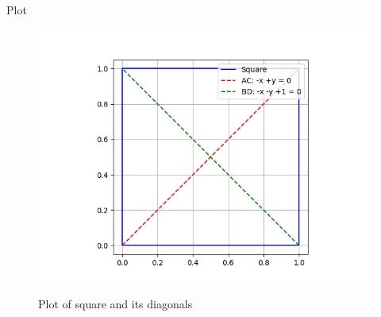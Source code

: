 \documentclass{beamer}
\begin{document}
\begin{frame}{Plot}
    \begin{figure}[H]
    \centering
    \caption{Plot of square and its diagonals}
    \includegraphics[width=0.6\columnwidth]{figs/Figure_1.png}
    \label{fig:1}
    \end{figure}
\end{frame}
\end{document}
